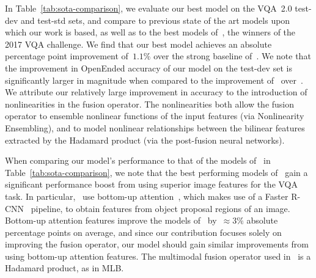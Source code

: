 In Table~\ref{tab:sota-comparison}, we evaluate our best model on the VQA~2.0
test-dev and test-std sets, and compare to previous state of the art models
upon which our work is based, as well as to the best models
of~\cite{teney2017tips}, the winners of the 2017 VQA challenge. We
find that our best model achieves an absolute percentage point improvement
of~$1.1\%$ over the strong baseline of~\cite{ben2017mutan}. We note that the
improvement in OpenEnded accuracy of our model on the test-dev set is
significantly larger in magnitude when compared to the improvement
of~\cite{ben2017mutan} over~\cite{DBLP:conf/emnlp/FukuiPYRDR16}. We attribute
our relatively large improvement in accuracy to the introduction of
nonlinearities in the fusion operator. The nonlinearities both allow the fusion
operator to ensemble nonlinear functions of the input features (via
Nonlinearity Ensembling), and to model nonlinear relationships between the
bilinear features extracted by the Hadamard product (via the post-fusion neural
networks).

When comparing our model's performance to that of the models
of~\cite{teney2017tips} in Table~\ref{tab:sota-comparison}, we note that the
best performing models of~\cite{teney2017tips} gain a significant performance
boost from using superior image features for the VQA task. In
particular,~\cite{teney2017tips} use bottom-up
attention~\cite{anderson2017bottom}, which makes use of a Faster
R-CNN~\cite{ren2015faster} pipeline, to obtain features from object proposal
regions of an image. Bottom-up attention features improve the models
of~\cite{teney2017tips} by~$\approx 3\%$ absolute percentage points on average,
and since our contribution focuses solely on improving the fusion operator, our
model should gain similar improvements from using bottom-up attention features.
The multimodal fusion operator used in~\cite{teney2017tips} is a Hadamard
product, as in MLB\@.

